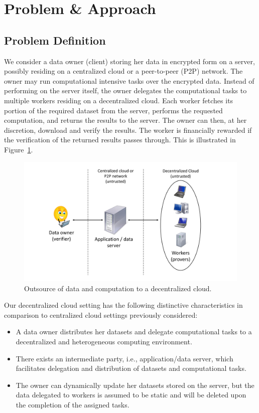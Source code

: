 \section{Problem \& Approach} \label{sect:overview}

\subsection{Problem Definition} \label{sect:problem}

We consider a data owner (client) storing her data in encrypted form on a server, possibly residing on a centralized cloud or a peer-to-peer (P2P) network.
The owner may run computational intensive tasks over the encrypted data.
Instead of performing on the server itself, the owner delegates the computational tasks to multiple workers residing on a decentralized cloud. 
Each worker fetches its portion of the required dataset from the server, performs the requested computation, and returns the results to the server.
The owner can then, at her discretion, download and verify the results.
The worker is financially rewarded if the verification of the returned results passes through.
This is illustrated in Figure~\ref{fig:model}.

\begin{figure}[h!]\centering
  \includegraphics[scale=0.30]{model.pdf}
  \caption{Outsource of data and computation to a decentralized cloud.}
  \label{fig:model}
\end{figure}

Our decentralized cloud setting has the following distinctive characteristics in comparison to centralized cloud settings previously considered:
\begin{itemize}
 \item A data owner distributes her datasets and delegate computational tasks to a decentralized and heterogeneous computing environment.
 \item There exists an intermediate party, i.e., application/data server, which facilitates delegation and distribution of datasets and computational tasks.
 \item The owner can dynamically update her datasets stored on the server, but the data delegated to workers is assumed to be static and will be deleted upon the completion of the assigned tasks.
\end{itemize}

